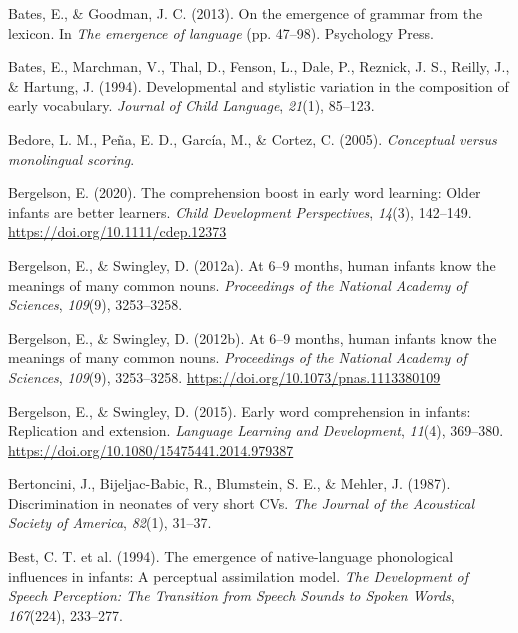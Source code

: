 \documentclass[
  12pt,
  b5paperpaper,
  twoside]{scrreprt}
\newlength{\cslhangindent}
\newlength{\cslentryspacingunit} %
\newenvironment{CSLReferences}[2] %
 {%
  \setlength{\parindent}{0pt}
  \ifodd #1
  \let\oldpar\par
  \def\par{\hangindent=\cslhangindent\oldpar}
  \fi
  \setlength{\parskip}{#2\cslentryspacingunit}
 }%
 {}
\begin{document}
\begin{CSLReferences}{1}{0}
\leavevmode{}%
Bates, E., \& Goodman, J. C. (2013). On the emergence of grammar from
the lexicon. In \emph{The emergence of language} (pp. 47--98).
Psychology Press.

\leavevmode{}%
Bates, E., Marchman, V., Thal, D., Fenson, L., Dale, P., Reznick, J. S.,
Reilly, J., \& Hartung, J. (1994). Developmental and stylistic variation
in the composition of early vocabulary. \emph{Journal of Child
Language}, \emph{21}(1), 85--123.

\leavevmode{}%
Bedore, L. M., Peña, E. D., García, M., \& Cortez, C. (2005).
\emph{Conceptual versus monolingual scoring}.

\leavevmode{}%
Bergelson, E. (2020). The comprehension boost in early word learning:
Older infants are better learners. \emph{Child Development
Perspectives}, \emph{14}(3), 142--149.
\url{https://doi.org/10.1111/cdep.12373}

\leavevmode{}%
Bergelson, E., \& Swingley, D. (2012a). At 6--9 months, human infants
know the meanings of many common nouns. \emph{Proceedings of the
National Academy of Sciences}, \emph{109}(9), 3253--3258.

\leavevmode{}%
Bergelson, E., \& Swingley, D. (2012b). At 6--9 months, human infants
know the meanings of many common nouns. \emph{Proceedings of the
National Academy of Sciences}, \emph{109}(9), 3253--3258.
\url{https://doi.org/10.1073/pnas.1113380109}

\leavevmode{}%
Bergelson, E., \& Swingley, D. (2015). Early word comprehension in
infants: Replication and extension. \emph{Language Learning and
Development}, \emph{11}(4), 369--380.
\url{https://doi.org/10.1080/15475441.2014.979387}

\leavevmode{}%
Bertoncini, J., Bijeljac-Babic, R., Blumstein, S. E., \& Mehler, J.
(1987). Discrimination in neonates of very short CVs. \emph{The Journal
of the Acoustical Society of America}, \emph{82}(1), 31--37.

\leavevmode{}%
Best, C. T. et al. (1994). The emergence of native-language phonological
influences in infants: A perceptual assimilation model. \emph{The
Development of Speech Perception: The Transition from Speech Sounds to
Spoken Words}, \emph{167}(224), 233--277.


\end{CSLReferences}
\end{document}
